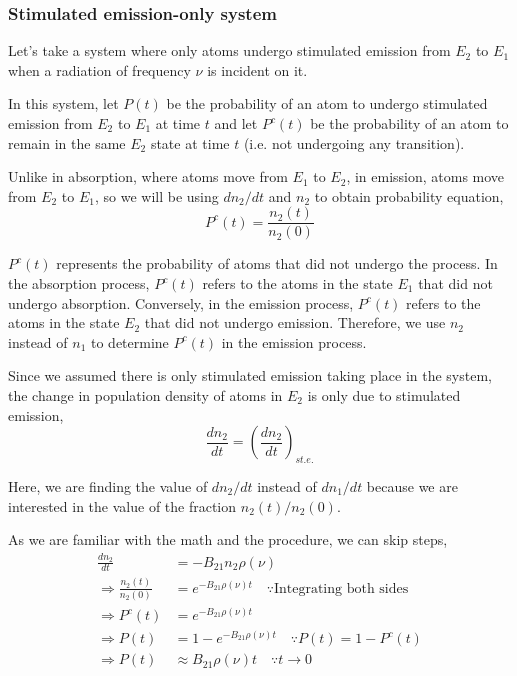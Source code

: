 \documentclass[12pt]{article}
\begin{document}
\subsubsection{Stimulated emission-only system}

Let's take a system where only atoms undergo stimulated emission from $E_{2}$ to $E_{1}$ when a radiation of frequency $\nu$ is incident on it. \vspace{.2cm}

In this system, let $P(t)$ be the probability of an atom to undergo stimulated emission from $E_{2}$ to $E_{1}$ at time $t$ and let $P^c(t)$ be the probability of an atom to remain in the same $E_{2}$ state at time $t$ (i.e. not undergoing any transition). \vspace{.2cm}

Unlike in absorption, where atoms move from $E_{1}$ to $E_{2}$, in emission, atoms move from $E_{2}$ to $E_{1}$, so we will be using $dn_{2}/dt$ and $n_{2}$ to obtain probability equation,
\begin{equation*}
    P^c(t) = \frac{n_{2}(t)}{n_{2}(0)}
\end{equation*}

$P^c(t)$ represents the probability of atoms that did not undergo the process. In the absorption process, $P^c(t)$ refers to the atoms in the state $E_1$ that did not undergo absorption. Conversely, in the emission process, $P^c(t)$ refers to the atoms in the state $E_2$ that did not undergo emission. Therefore, we use $n_2$ instead of $n_1$ to determine $P^c(t)$ in the emission process. \vspace{.2cm}

Since we assumed there is only stimulated emission taking place in the system, the change in population density of atoms in $E_{2}$ is only due to stimulated emission,
\begin{equation*}
    \frac{dn_{2}}{dt} = (\frac{dn_{2}}{dt})_{st.e.}
\end{equation*} \vspace{.1cm}

Here, we are finding the value of $dn_{2}/dt$ instead of $dn_{1}/dt$ because we are interested in the value of the fraction $n_{2}(t)/n_{2}(0)$. \vspace{.2cm}

As we are familiar with the math and the procedure, we can skip steps,
\begin{align*}
    \frac{dn_{2}}{dt} &= -B_{21}n_{2}\rho(\nu) \\
    \Rightarrow \frac{n_2(t)}{n_2(0)} &= e^{-B_{21}\rho(\nu)t} \quad \because \text{Integrating both sides} \\
    \Rightarrow P^c(t) &= e^{-B_{21}\rho(\nu)t} \\
    \Rightarrow P(t) &= 1 - e^{-B_{21}\rho(\nu)t} \quad \because P(t) = 1 - P^c(t) \\
    \Rightarrow P(t) & \approx B_{21}\rho(\nu)t \quad \because t \to 0
\end{align*}
\end{document}
